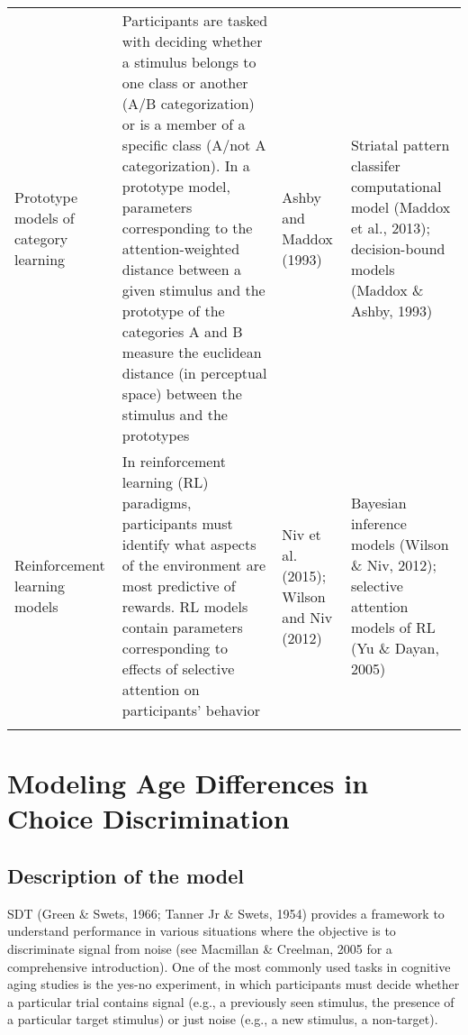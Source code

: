 \documentclass[
  english,
  ,man,floatsintext]{apa6}
\begin{document}
\begin{landscape}
\begin{table}[t]
{\begin{tabular}{p{}p{}p{}p{}}
  Prototype models of category learning & Participants are tasked with deciding whether a stimulus belongs to one class or another (A/B categorization) or is a member of a specific class (A/not A categorization). In a prototype model, parameters corresponding to the attention-weighted distance between a given stimulus and the prototype of the categories A and B measure the euclidean distance (in perceptual space) between the stimulus and the prototypes & Ashby and Maddox (1993) & Striatal pattern classifer computational model (Maddox et al., 2013); decision-bound models (Maddox \& Ashby, 1993) \\ 
  Reinforcement learning models & In reinforcement learning (RL) paradigms, participants must identify what aspects of the environment are most predictive of rewards. RL models contain parameters corresponding to effects of selective attention on participants' behavior & Niv et al. (2015); Wilson and Niv (2012) & Bayesian inference models (Wilson \& Niv, 2012); selective attention models of RL (Yu \& Dayan, 2005) \\ 
   \bottomrule \\ \end{tabular}
}
\end{table}
\end{landscape}

\hypertarget{modeling-age-differences-in-choice-discrimination}{%
\section{Modeling Age Differences in Choice Discrimination}\label{modeling-age-differences-in-choice-discrimination}}

\hypertarget{description-of-the-model}{%
\subsection{Description of the model}\label{description-of-the-model}}

SDT (Green \& Swets, 1966; Tanner Jr \& Swets, 1954) provides a framework to understand performance in various situations where the objective is to discriminate signal from noise (see Macmillan \& Creelman, 2005 for a comprehensive introduction). One of the most commonly used tasks in cognitive aging studies is the yes-no experiment, in which participants must decide whether a particular trial contains signal (e.g., a previously seen stimulus, the presence of a particular target stimulus) or just noise (e.g., a new stimulus, a non-target).
\end{document}

